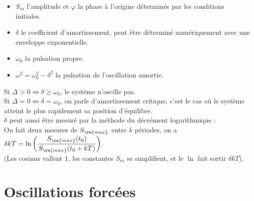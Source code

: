 \documentclass[13pt, twoside, a4paper, french]{report}
\begin{document}
        
        \begin{itemize}
            \item $S_m$ l'amplitude et $\varphi$ la phase à l'origine déterminés par les conditions initiales.
            \item $\delta$ le coefficient d'amortissement, peut être déterminé numériquement avec une enveloppe exponentielle.
            \item $\omega_0$ la pulsation propre.
            \item $\omega^2 = \omega_0^2 - \delta^2$ la pulsation de l'oscillation amortie.
        \end{itemize}
        \vspace{7pt}
        Si $\Delta > 0 \iff \delta \ge \omega_0$, le système n'oscille pas.\\
        Si $\Delta = 0 \iff \delta = \omega_0$, on parle d'amortissement critique, c'est le cas où le système atteint le plus rapidement sa position d'équilibre.\\
        
        $\delta$ peut aussi être mesuré par la méthode du décrément logarithmique :\\
        On fait deux mesures de $S_\re{max}$ entre $k$ périodes, on a $\delta k T = \ln\left(\dfrac{S_\re{max}(t_0)}{S_\re{max}(t_0 + kT)}\right)$.\\
        (Les cosinus vallent $1$, les constantes $S_m$ se simplifient, et le $\ln$ fait sortir $\delta k T$).
    
    
    \section{Oscillations forcées}
        
\end{document}
